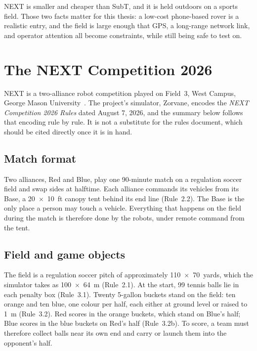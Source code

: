 NEXT is smaller and cheaper than SubT, and it is held outdoors on a sports field.
Those two facts matter for this thesis: a low-cost phone-based rover is a realistic entry, and the field is large enough that GPS, a long-range network link, and operator attention all become constraints, while still being safe to test on.

\section{The NEXT Competition 2026}
\label{sec:next-rules}

NEXT is a two-alliance robot competition played on Field~3, West Campus, George Mason University~\citep{nextrules2026}.
The project's simulator, Zorvane, encodes the \emph{NEXT Competition 2026 Rules} dated August 7, 2026, and the summary below follows that encoding rule by rule.
It is not a substitute for the rules document, which should be cited directly once it is in hand.

\subsection{Match format}

Two alliances, Red and Blue, play one 90-minute match on a regulation soccer field and swap sides at halftime.
Each alliance commands its vehicles from its Base, a 20~$\times$~10~ft canopy tent behind its end line (Rule~2.2).
The Base is the only place a person may touch a vehicle.
Everything that happens on the field during the match is therefore done by the robots, under remote command from the tent.

\subsection{Field and game objects}

The field is a regulation soccer pitch of approximately 110~$\times$~70~yards, which the simulator takes as 100~$\times$~64~m (Rule~2.1).
At the start, 99 tennis balls lie in each penalty box (Rule~3.1).
Twenty 5-gallon buckets stand on the field: ten orange and ten blue, one colour per half, each either at ground level or raised to 1~m (Rule~3.2).
Red scores in the orange buckets, which stand on Blue's half; Blue scores in the blue buckets on Red's half (Rule~3.2b).
To score, a team must therefore collect balls near its own end and carry or launch them into the opponent's half.

